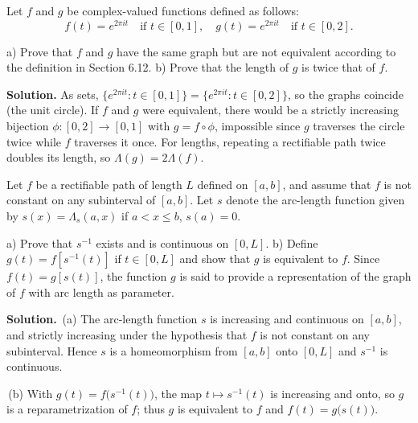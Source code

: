\begin{problembox}
Let $f$ and $g$ be complex-valued functions defined as follows:
\[f(t) = e^{2\pi it} \quad \text{if } t \in [0, 1], \quad g(t) = e^{2\pi it} \quad \text{if } t \in [0, 2].\]

a) Prove that $f$ and $g$ have the same graph but are not equivalent according to the definition in Section 6.12.
b) Prove that the length of $g$ is twice that of $f$.
\end{problembox}

\noindent\textbf{Solution.}
As sets, $\{e^{2\pi it}:t\in[0,1]\}=\{e^{2\pi it}:t\in[0,2]\}$, so the graphs coincide (the unit circle). If $f$ and $g$ were equivalent, there would be a strictly increasing bijection $\phi:[0,2]\to[0,1]$ with $g=f\circ\phi$, impossible since $g$ traverses the circle twice while $f$ traverses it once. For lengths, repeating a rectifiable path twice doubles its length, so $\Lambda(g)=2\Lambda(f)$.

\begin{problembox}
Let $f$ be a rectifiable path of length $L$ defined on $[a, b]$, and assume that $f$ is not constant on any subinterval of $[a, b]$. Let $s$ denote the arc-length function given by $s(x) = \Lambda_s(a, x)$ if $a < x \leq b$, $s(a) = 0$.

a) Prove that $s^{-1}$ exists and is continuous on $[0, L]$.
b) Define $g(t) = f[s^{-1}(t)]$ if $t \in [0, L]$ and show that $g$ is equivalent to $f$. Since $f(t) = g[s(t)]$, the function $g$ is said to provide a representation of the graph of $f$ with arc length as parameter.
\end{problembox}

\noindent\textbf{Solution.}
\,(a) The arc-length function $s$ is increasing and continuous on $[a,b]$, and strictly increasing under the hypothesis that $f$ is not constant on any subinterval. Hence $s$ is a homeomorphism from $[a,b]$ onto $[0,L]$ and $s^{-1}$ is continuous.

\,(b) With $g(t)=f\big(s^{-1}(t)\big)$, the map $t\mapsto s^{-1}(t)$ is increasing and onto, so $g$ is a reparametrization of $f$; thus $g$ is equivalent to $f$ and $f(t)=g\big(s(t)\big)$.

